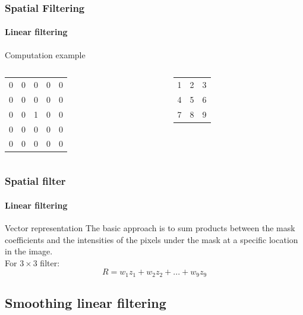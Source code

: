 \documentclass[table]{beamer}
\begin{document}
\begin{frame}
  \frametitle{Spatial Filtering}
  \framesubtitle{Linear filtering}
  \begin{block}{Computation example}
    \begin{columns}
      \begin{column}{.5\linewidth}
        \begin{center}
          \begin{tabular}{|ccccc|}\hline
            0 & 0 & 0 & 0 & 0\\ 
            0 & 0 & 0 & 0 & 0\\ 
            0 & 0 & 1 & 0 & 0\\ 
            0 & 0 & 0 & 0 & 0\\ 
            0 & 0 & 0 & 0 & 0\\\hline 
          \end{tabular}
        \end{center}
      \end{column}
       \begin{column}{.5\linewidth}
        \begin{center}
          \begin{tabular}{|ccc|}\hline
            1 & 2 & 3 \\ 
            4 & 5 & 6 \\ 
            7 & 8 & 9 \\ \hline
          \end{tabular}
        \end{center}
      \end{column}
    \end{columns}
  \end{block}
\end{frame}



\begin{frame}
\frametitle{Spatial filter}
\framesubtitle{Linear filtering}
\begin{block}{Vector representation}
The basic approach is to sum products between the mask coefficients and the intensities of the pixels under the mask at a specific location in the image. \\
For $3 \times 3$ filter: 
$$R = w_{1}z_{1}+w_{2}z_{2}+...+w_{9}z_{9}$$
\end{block}
\end{frame}

\subsection{Smoothing linear filtering}
\end{document}
